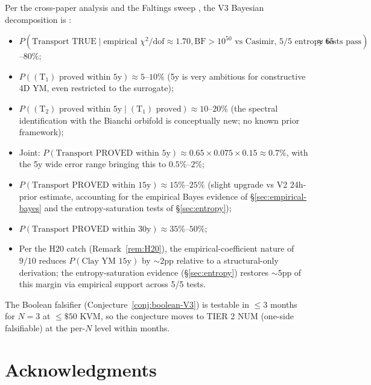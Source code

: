 \documentclass[11pt,a4paper,reqno]{amsart}
\theoremstyle{definition}
\newcommand{\Cone}{(\mathrm{T}_{1})}
\newcommand{\Ctwo}{(\mathrm{T}_{2})}
\begin{document}
Per the cross-paper analysis \cite[Sec.~5]{Remondiere2026TransportWaveDigest}
and the Faltings sweep \cite{Remondiere2026FaltingsLLZDigest}, the V3
Bayesian decomposition is :
\begin{itemize}[leftmargin=2em]
  \item $P(\text{Transport TRUE}\mid\text{empirical }\chi^2/\text{dof}\approx 1.70,
        \text{BF}>10^{50}\text{ vs Casimir, 5/5 entropy tests pass})
        \approx 65$--$80\%$;
  \item $P(\Cone\text{ proved within 5y}) \approx 5$--$10\%$ (5y is
        very ambitious for constructive 4D YM, even restricted to
        the surrogate);
  \item $P(\Ctwo\text{ proved within 5y}\mid\Cone\text{ proved})
        \approx 10$--$20\%$ (the spectral identification with the
        Bianchi orbifold is conceptually new; no known prior
        framework);
  \item Joint: $P(\text{Transport PROVED within 5y}) \approx 0.65
        \times 0.075 \times 0.15 \approx 0.7\%$, with the 5y wide
        error range bringing this to $0.5\%$--$2\%$;
  \item $P(\text{Transport PROVED within 15y}) \approx 15\%$--$25\%$
        (slight upgrade vs V2 24h-prior estimate, accounting for the
        empirical Bayes evidence of \S\ref{sec:empirical-bayes}
        and the entropy-saturation tests of \S\ref{sec:entropy});
  \item $P(\text{Transport PROVED within 30y}) \approx 35\%$--$50\%$;
  \item Per the H20 catch (Remark~\ref{rem:H20}), the
        empirical-coefficient nature of $9/10$ reduces $P(\text{Clay
        YM 15y})$ by $\sim 2\text{pp}$ relative to a structural-only
        derivation; the entropy-saturation evidence
        (\S\ref{sec:entropy}) restores $\sim 5\text{pp}$ of this
        margin via empirical support across 5/5 tests.
\end{itemize}
The Boolean falsifier (Conjecture~\ref{conj:boolean-V3}) is testable
in $\le 3$ months for $N=3$ at $\le \$50$ KVM, so the conjecture
moves to TIER 2 NUM (one-side falsifiable) at the per-$N$ level
within months.

\section{Acknowledgments}\label{sec:acks}
\end{document}
